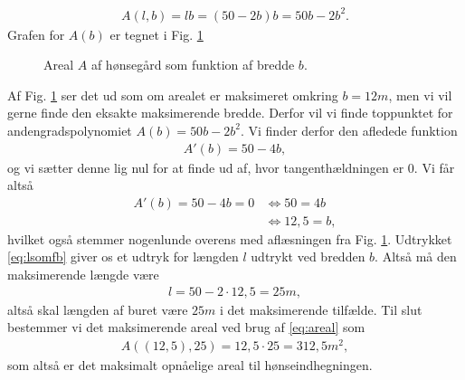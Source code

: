\begin{exa}
\begin{align*}
A(l,b) = lb = (50-2b)b = 50b-2b^2.
\end{align*}
Grafen for $A(b)$ er tegnet i Fig. \ref{fig:honsegraf}
\begin{figure}[H]
	\centering
	\caption{Areal $A$ af hønsegård som funktion af bredde $b$.}
	\label{fig:honsegraf}
\end{figure}

Af Fig. \ref{fig:honsegraf} ser det ud som om arealet er maksimeret omkring $b=12m$, men vi vil gerne finde den eksakte maksimerende bredde. Derfor vil vi finde toppunktet for andengradspolynomiet $A(b) = 50b-2b^2$. Vi finder derfor den afledede funktion
\begin{align*}
A'(b) = 50-4b,
\end{align*}
og vi sætter denne lig nul for at finde ud af, hvor tangenthældningen er $0$. Vi får altså
\begin{align*}
A'(b) = 50-4b = 0 &\Leftrightarrow 50=4b\\
&\Leftrightarrow 12,5=b,
\end{align*}
hvilket også stemmer nogenlunde overens med aflæsningen fra Fig. \ref{fig:honsegraf}. Udtrykket \eqref{eq:lsomfb} giver os et udtryk for længden $l$ udtrykt ved bredden $b$. Altså må den maksimerende længde være 
\begin{align*}
l = 50-2\cdot 12,5 = 25m,
\end{align*}
altså skal længden af buret være $25m$ i det maksimerende tilfælde. Til slut bestemmer vi det maksimerende areal ved brug af \eqref{eq:areal} som
\begin{align*}
A((12,5),25) = 12,5\cdot25 = 312,5m^2,
\end{align*}
som altså er det maksimalt opnåelige areal til hønseindhegningen. 
\end{exa}
